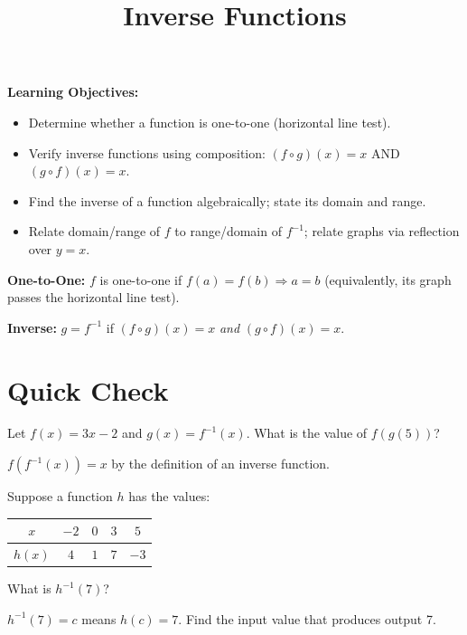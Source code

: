 \documentclass{ximera}
\title{Inverse Functions}
\begin{document}
\begin{abstract}
\end{abstract}
\maketitle

\textbf{Learning Objectives:}
\begin{itemize}
  \item Determine whether a function is one-to-one (horizontal line test).
  \item Verify inverse functions using composition: $(f\circ g)(x)=x$ AND $(g\circ f)(x)=x$.
  \item Find the inverse of a function algebraically; state its domain and range.
  \item Relate domain/range of $f$ to range/domain of $f^{-1}$; relate graphs via reflection over $y=x$.
\end{itemize}
\medskip

\noindent\textbf{One-to-One:} $f$ is one-to-one if $f(a)=f(b)\Rightarrow a=b$ (equivalently, its graph passes the horizontal line test).

\noindent\textbf{Inverse:} $g=f^{-1}$ if $(f\circ g)(x)=x$ \emph{and} $(g\circ f)(x)=x$.

\bigskip
\section*{Quick Check}

\begin{problem}
Let $f(x) = 3x-2$ and $g(x) = f^{-1}(x)$. What is the value of $f(g(5))$?
\begin{hint}
$f(f^{-1}(x)) = x$ by the definition of an inverse function.
\end{hint}
\begin{multipleChoice}
\end{multipleChoice}
\end{problem}

\begin{problem}
Suppose a function $h$ has the values:
\begin{center}
\begin{tabular}{|c|c|c|c|c|}
\hline
$x$ & $-2$ & $0$ & $3$ & $5$ \\\hline
$h(x)$ & $4$ & $1$ & $7$ & $-3$ \\\hline
\end{tabular}
\end{center}
What is $h^{-1}(7)$?
\begin{hint}
$h^{-1}(7) = c$ means $h(c) = 7$. Find the input value that produces output 7.
\end{hint}
\begin{multipleChoice}
\end{multipleChoice}
\end{problem}
\end{document}
